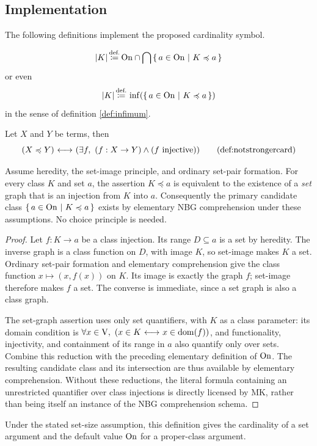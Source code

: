 \subsection{Implementation}
The following definitions implement the proposed cardinality symbol.
\begin{definition}
\[
|K|\,{\stackrel{{\textrm{def.}}}{\coloneqq}}\, \mathrm{On} \cap \bigcap \left\{\,a\in\mathrm{On}\ \middle|\ K\preccurlyeq a\,\right\}
\]
or even
\[
|K|\,{\stackrel{{\textrm{def.}}}{\coloneqq}}\, \inf(\left\{\,a\in\mathrm{On}\ \middle|\ K\preccurlyeq a\,\right\})
\]
in the sense of definition \ref{def:infimum}.
\end{definition}
\begin{definition}
Let $X$ and $Y$ be terms, then
\[
(X\preccurlyeq Y)
\iff
(\exists f,\ (f:X\to Y)\land (f \injective))
\labeltagd{def}{notstrongercard}
\]
\end{definition}
\begin{proposition}
Assume heredity, the set-image principle, and ordinary set-pair
formation. For every class $K$ and set $a$, the assertion
$K\preccurlyeq a$ is equivalent to the existence of a \emph{set}
graph that is an injection from $K$ into $a$. Consequently the primary
candidate class $\left\{\,a\in\mathrm{On}\ \middle|\ K\preccurlyeq a\,\right\}$ exists by elementary
NBG comprehension under these assumptions. No choice principle is needed.
\end{proposition}
\begin{proof}
Let $f:K\to a$ be a class injection. Its range $D\subseteq a$ is a
set by heredity. The inverse graph is a class function on $D$, with
image $K$, so set-image makes $K$ a set. Ordinary set-pair formation
and elementary comprehension give the class function
$x\mapsto(x,f(x))$ on $K$. Its image is exactly the graph $f$;
set-image therefore makes $f$ a set. The converse is immediate, since
a set graph is also a class graph.

The set-graph assertion uses only set quantifiers, with $K$ as a class
parameter: its domain condition is
$\forall x\in\mathrm{V},\ (x\in K{\ \longleftrightarrow\ } x\in\operatorname{dom}(f))$,
and functionality, injectivity, and containment of its range in $a$
also quantify only over sets. Combine this reduction with the preceding
elementary definition of $\mathrm{On}$. The resulting candidate class and its
intersection are thus available by elementary comprehension. Without
these reductions, the literal formula containing an unrestricted
quantifier over class injections is directly licensed by MK, rather
than being itself an instance of the NBG comprehension schema.
\end{proof}
Under the stated set-size assumption, this definition gives the cardinality of a set argument and the default value $\mathrm{On}$ for a proper-class argument.

